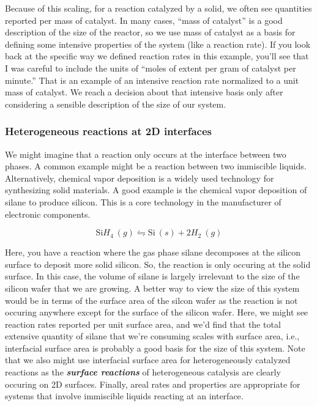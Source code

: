 \documentclass[11pt]{article}
\begin{document}
Because of this scaling, for a reaction catalyzed by a solid, we often
see quantities reported per mass of catalyst. In many cases, ``mass of
catalyst'' is a good description of the size of the reactor, so we use
mass of catalyst as a basis for defining some intensive properties of
the system (like a reaction rate). If you look back at the specific way
we defined reaction rates in this example, you'll see that I was careful
to include the units of ``moles of extent per gram of catalyst per
minute.'' That is an example of an intensive reaction rate normalized to
a unit mass of catalyst. We reach a decision about that intensive basis
only after considering a sensible description of the size of our system.

    \hypertarget{heterogeneous-reactions-at-2d-interfaces}{%
\subsubsection{Heterogeneous reactions at 2D
interfaces}\label{heterogeneous-reactions-at-2d-interfaces}}

We might imagine that a reaction only occurs at the interface between
two phases. A common example might be a reaction between two immiscible
liquids. Alternatively, chemical vapor deposition is a widely used
technology for synthesizing solid materials. A good example is the
chemical vapor deposition of silane to produce silicon. This is a core
technology in the manufacturer of electronic components.

\[\text{Si} H_4 \ (g) \leftrightharpoons \text{Si} \ (s) + 2H_2 \ (g)\]

Here, you have a reaction where the gas phase silane decomposes at the
silicon surface to deposit more solid silicon. So, the reaction is only
occuring at the solid surface. In this case, the volume of silane is
largely irrelevant to the size of the silicon wafer that we are growing.
A better way to view the size of this system would be in terms of the
surface area of the silcon wafer as the reaction is not occuring
anywhere except for the surface of the silicon wafer. Here, we might see
reaction rates reported per unit surface area, and we'd find that the
total extensive quantity of silane that we're consuming scales with
surface area, i.e., interfacial surface area is probably a good basis
for the size of this system. Note that we also might use interfacial
surface area for heterogeneously catalyzed reactions as the
\textbf{\emph{surface reactions}} of heterogeneous catalysis are clearly
occuring on 2D surfaces. Finally, areal rates and properties are
appropriate for systems that involve immiscible liquids reacting at an
interface.
\end{document}
